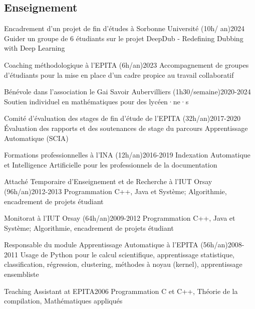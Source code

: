 \begin{fr}
\subsection{Enseignement}


\begin{jobshort}{Encadrement d'un projet de fin d'études à Sorbonne Université (10h/ an)}{2024}
Guider un groupe de 6 étudiants sur le projet DeepDub - Redefining Dubbing with Deep Learning
\end{jobshort}


\begin{jobshort}{Coaching méthodologique à l'EPITA (6h/an)}{2023}
Accompagnement de groupes d'étudiants pour la mise en place d'un cadre propice au travail collaboratif
\end{jobshort}

\begin{jobshort}{Bénévole dans l'association le Gai Savoir Aubervilliers (1h30/semaine)}{2020-2024}
Soutien individuel en mathématiques pour des lycéen·ne·s
\end{jobshort}

\begin{jobshort}{Comité d'évaluation des stages de fin d'étude de l'EPITA (32h/an)}{2017-2020}
\'Evaluation des rapports et des soutenances de stage du parcours Apprentissage Automatique (SCIA)
\end{jobshort}

\begin{jobshort}{Formations professionnelles à l'INA (12h/an)}{2016-2019}
Indexation Automatique et Intelligence Artificielle pour les professionnels de la documentation
\end{jobshort}

\begin{jobshort}{Attaché Temporaire d'Enseignement et de Recherche à l'IUT Orsay (96h/an)}{2012-2013}
Programmation C++, Java et Système; Algorithmie, encadrement de projets étudiant
\end{jobshort}

\begin{jobshort}{Monitorat à l'IUT Orsay (64h/an)}{2009-2012}
Programmation C++, Java et Système; Algorithmie, encadrement de projets étudiant
\end{jobshort}

\begin{jobshort}{Responsable du module Apprentissage Automatique à l'EPITA (56h/an)}{2008-2011}
Usage de Python pour le calcul scientifique, apprentissage statistique, classification, régression, clustering, méthodes à noyau (kernel), apprentissage ensembliste
\end{jobshort}

\begin{jobshort}{Teaching Assistant at EPITA}{2006}
Programmation C et C++, Théorie de la compilation,  Mathématiques appliqués
\end{jobshort}

\end{fr}










